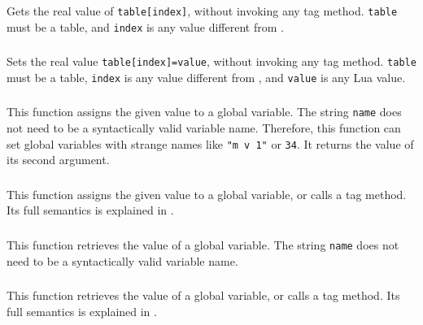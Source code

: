 \subsubsection*{\ff {}}
Gets the real value of \verb|table[index]|,
without invoking any tag method.
\verb|table| must be a table,
and \verb|index| is any value different from \nil.

\subsubsection*{\ff {}}
Sets the real value \verb|table[index]=value|,
without invoking any tag method.
\verb|table| must be a table,
\verb|index| is any value different from \nil,
and \verb|value| is any Lua value.

\subsubsection*{\ff {}}
This function assigns the given value to a global variable.
The string \verb|name| does not need to be a
syntactically valid variable name.
Therefore,
this function can set global variables with strange names like
\verb|"m v 1"| or \verb|34|.
It returns the value of its second argument.

\subsubsection*{\ff {}}
This function assigns the given value to a global variable,
or calls a tag method.
Its full semantics is explained in .

\subsubsection*{\ff {}}
This function retrieves the value of a global variable.
The string \verb|name| does not need to be a
syntactically valid variable name.

\subsubsection*{\ff {}}
This function retrieves the value of a global variable,
or calls a tag method.
Its full semantics is explained in .


